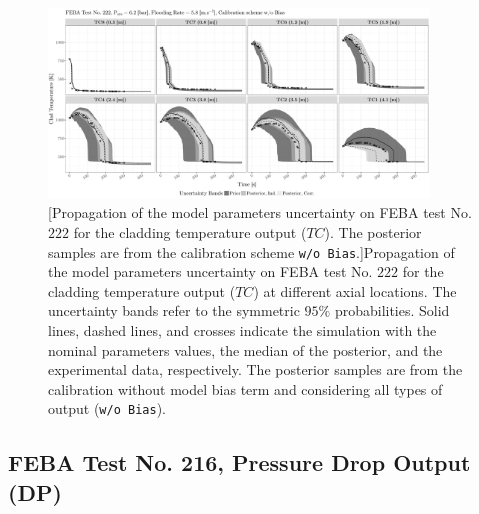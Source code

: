 \clearpage
\begin{figure}
	\centering
	\includegraphics[width=0.90\textwidth]{../figures/chapter5/figures/plotTraceUQPosteriorAllNoDiscNoBCTC222}
		[Propagation of the model parameters uncertainty on FEBA test No. $222$ for the cladding temperature output ($TC$). The posterior samples are from the calibration scheme \texttt{w/o Bias}.]{Propagation of the model parameters uncertainty on FEBA test No. $222$ for the cladding temperature output ($TC$) at different axial locations. The uncertainty bands refer to the symmetric $95\%$ probabilities. Solid lines, dashed lines, and crosses indicate the simulation with the nominal parameters values, the median of the posterior, and the experimental data, respectively. The posterior samples are from the calibration without model bias term and considering all types of output (\texttt{w/o Bias}).}
	\label{fig:ch5_plot_trace_uq_post_tc_222_nodisc}
\end{figure}
\clearpage

\subsection{FEBA Test No. 216, Pressure Drop Output (DP)}\label{app:tbl_results_uq_post_dp_216}


